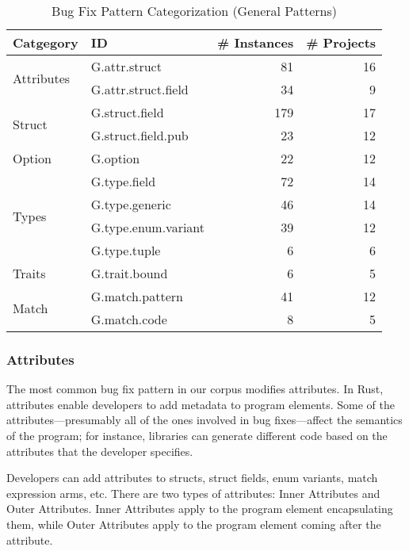 \begin{table}[]

\begin{tabular}{l|l|r|r}
\textbf{Catgegory} & \textbf{ID} & \textbf{\# Instances} & \textbf{\# Projects} \\
\hline
\multirow{2}{*}{Attributes} & G.attr.struct & 81 & 16                                  \\
& G.attr.struct.field & 34 & 9                     \\\cline{1-4}
\multirow{2}{*}{Struct} & G.struct.field  & 179 & 17\\
& G.struct.field.pub & 23 & 12   
\\\cline{1-4}
Option & G.option & 22 & 12                    \\\cline{1-4}
\multirow{4}{*}{Types} & G.type.field  & 72 & 14 \\
& G.type.generic & 46 & 14\\ & G.type.enum.variant  & 39 & 12 \\
& G.type.tuple & 6 & 6                                         \\\cline{1-4}
\multirow{1}{*}{Traits} & G.trait.bound & 6 & 5 \\\cline{1-4}
\multirow{2}{*}{Match} & G.match.pattern & 41 & 12 \\
& G.match.code & 8 & 5 \\
\end{tabular}
\caption{\label{table:general}Bug Fix Pattern Categorization (General Patterns)}
\end{table}
    

\subsubsection{Attributes}
The most common bug fix pattern in our corpus modifies attributes. In Rust, attributes enable developers to add metadata to program elements. Some of the attributes---presumably all of the ones involved in bug fixes---affect the semantics of the program; for instance, libraries can generate different code based on the attributes that the developer specifies.

Developers can add attributes to structs, struct fields, enum variants, match expression arms, etc. There are two types of attributes: Inner Attributes and Outer Attributes. Inner Attributes apply to the program element encapsulating them, while Outer Attributes apply to the program element coming after the attribute.


